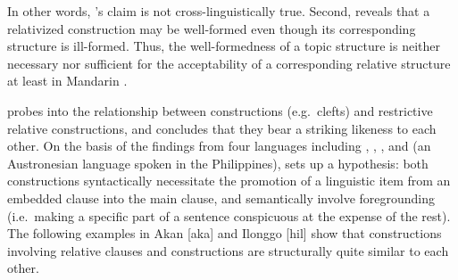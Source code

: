 

\noindent In other words, \citeauthor{kuno:76}'s claim
 is not cross-linguistically true.  Second,
\citet{ning:93} reveals that a relativized construction may be
well-formed even though its corresponding  structure is
ill-formed.  Thus, the well-formedness of a topic structure is neither
necessary nor sufficient for the acceptability of a corresponding
relative structure at least in Mandarin .


\citet{schachter:73} probes into the relationship between 
constructions (e.g.\ clefts) and restrictive relative
constructions, and concludes that they bear a striking likeness to
each other. On the basis of the findings from four languages including
, , , and  (an
Austronesian language spoken in the Philippines),
\citeauthor{schachter:73} sets up a hypothesis: both constructions
syntactically necessitate the promotion of a linguistic item from an
embedded clause into the main clause, and semantically involve
foregrounding (i.e.\ making a specific part of a sentence conspicuous
at the expense of the rest). The following examples in Akan [aka] and
Ilonggo [hil] show that constructions involving relative clauses and
 constructions are structurally quite similar to each other.





